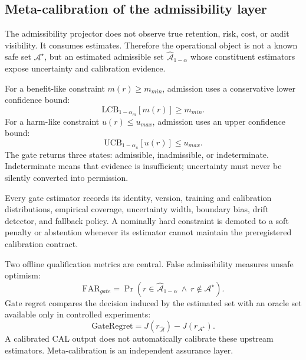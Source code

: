 \documentclass[11pt,a4paper]{article}
\begin{document}
\subsection{Meta-calibration of the admissibility layer}
The admissibility projector does not observe true retention, risk, cost, or audit visibility. It consumes estimates. Therefore the operational object is not a known safe set $\mathcal A^\star$, but an estimated admissible set $\widehat{\mathcal A}_{1-\alpha}$ whose constituent estimators expose uncertainty and calibration evidence.

For a benefit-like constraint $m(r)\ge m_{min}$, admission uses a conservative lower confidence bound:
\begin{equation}
\mathrm{LCB}_{1-\alpha_m}[m(r)]\ge m_{min}.
\end{equation}
For a harm-like constraint $u(r)\le u_{max}$, admission uses an upper confidence bound:
\begin{equation}
\mathrm{UCB}_{1-\alpha_u}[u(r)]\le u_{max}.
\end{equation}
The gate returns three states: admissible, inadmissible, or indeterminate. Indeterminate means that evidence is insufficient; uncertainty must never be silently converted into permission.

Every gate estimator records its identity, version, training and calibration distributions, empirical coverage, uncertainty width, boundary bias, drift detector, and fallback policy. A nominally hard constraint is demoted to a soft penalty or abstention whenever its estimator cannot maintain the preregistered calibration contract.

Two offline qualification metrics are central. False admissibility measures unsafe optimism:
\begin{equation}
\mathrm{FAR}_{gate}=\Pr\left(r\in\widehat{\mathcal A}_{1-\alpha}\ \wedge\ r\notin\mathcal A^\star\right).
\end{equation}
Gate regret compares the decision induced by the estimated set with an oracle set available only in controlled experiments:
\begin{equation}
\mathrm{GateRegret}=J(r_{\widehat{\mathcal A}})-J(r_{\mathcal A^\star}).
\end{equation}
A calibrated CAL output does not automatically calibrate these upstream estimators. Meta-calibration is an independent assurance layer.
\end{document}

